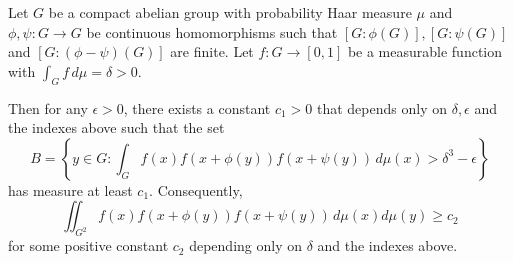 \begin{theorem}
\label{th:roth-khintchine}
Let $G$ be a compact abelian group with  probability Haar measure $\mu$ and $\phi, \psi: G \to G$ be continuous homomorphisms such that $[G: \phi(G)], [G: \psi(G)]$ and $[G: (\phi-\psi)(G)]$ are finite. 
Let $f: G \to [0, 1]$ be a measurable function with $\int_G f \, d \mu = \delta >0$.
 
Then for any $\epsilon > 0$, there exists a constant $c_1 >0$ that depends only on $\delta, \epsilon$ and the indexes above such that the set
\[
    B = \left\{y \in G: \int_G f(x) f(x+ \phi(y)) f(x + \psi(y)) \, d \mu(x) > \delta^3 - \epsilon \right\}
\]
has measure at least $c_1$. Consequently,
\begin{equation} \label{eq:counting-roth}
\iint_{G^2} f(x) f(x+ \phi(y)) f(x + \psi(y)) \, d \mu(x) d\mu(y) \geq c_2 
\end{equation}
for some positive constant $c_2$ depending only on $\delta$ and the indexes above.
\end{theorem}
